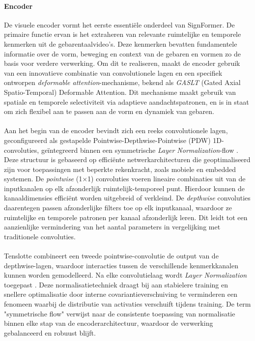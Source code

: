 \paragraph{Encoder}
De visuele encoder vormt het eerste essentiële onderdeel van SignFormer.
De primaire functie ervan is het extraheren van relevante ruimtelijke en temporele kenmerken uit de gebarentaalvideo's.
Deze kenmerken bevatten fundamentele informatie over de vorm, beweging en context van de gebaren en vormen zo de basis voor verdere verwerking.
Om dit te realiseren, maakt de encoder gebruik van een innovatieve combinatie van convolutionele lagen en een specifiek ontworpen \emph{deformable attention}-mechanisme, bekend als \emph{GASLT} (Gated Axial Spatio-Temporal) Deformable Attention.
Dit mechanisme maakt gebruik van spatiale en temporele selectiviteit via adaptieve aandachtspatronen, en is in staat om zich flexibel aan te passen aan de vorm en dynamiek van gebaren.
\\
\\
Aan het begin van de encoder bevindt zich een reeks convolutionele lagen, geconfigureerd als gestapelde Pointwise-Depthwise-Pointwise (PDW) 1D-convoluties, geïntegreerd binnen een symmetrische \emph{Layer Normalization}-flow \autocite{howard2017mobilenets}.
Deze structuur is gebaseerd op efficiënte netwerkarchitecturen die geoptimaliseerd zijn voor toepassingen met beperkte rekenkracht, zoals mobiele en embedded systemen.
De \emph{pointwise} (1×1) convoluties voeren lineaire combinaties uit van de inputkanalen op elk afzonderlijk ruimtelijk-temporeel punt.
Hierdoor kunnen de kanaaldimensies efficiënt worden uitgebreid of verkleind.
De \emph{depthwise} convoluties daarentegen passen afzonderlijke filters toe op elk inputkanaal, waardoor ze ruimtelijke en temporele patronen per kanaal afzonderlijk leren.
Dit leidt tot een aanzienlijke vermindering van het aantal parameters in vergelijking met traditionele convoluties.
\\
\\
Tenslotte combineert een tweede pointwise-convolutie de output van de depthwise-lagen, waardoor interacties tussen de verschillende kenmerkkanalen kunnen worden gemodelleerd.
Na elke convolutielaag wordt \emph{Layer Normalization} toegepast \autocite{ba2016layer}.
Deze normalisatietechniek draagt bij aan stabielere training en snellere optimalisatie door interne covariantieverschuiving te verminderen een fenomeen waarbij de distributie van activaties verschuift tijdens training.
De term "symmetrische flow" \space verwijst naar de consistente toepassing van normalisatie binnen elke stap van de encoderarchitectuur, waardoor de verwerking gebalanceerd en robuust blijft.

